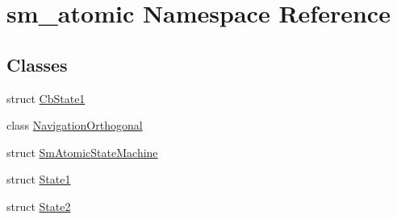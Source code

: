 \hypertarget{namespacesm__atomic}{}\section{sm\+\_\+atomic Namespace Reference}
\label{namespacesm__atomic}
\subsection*{Classes}
\begin{DoxyCompactItemize}
\item 
struct \hyperlink{structsm__atomic_1_1CbState1}{Cb\+State1}
\item 
class \hyperlink{classsm__atomic_1_1NavigationOrthogonal}{Navigation\+Orthogonal}
\item 
struct \hyperlink{structsm__atomic_1_1SmAtomicStateMachine}{Sm\+Atomic\+State\+Machine}
\item 
struct \hyperlink{structsm__atomic_1_1State1}{State1}
\item 
struct \hyperlink{structsm__atomic_1_1State2}{State2}
\end{DoxyCompactItemize}
